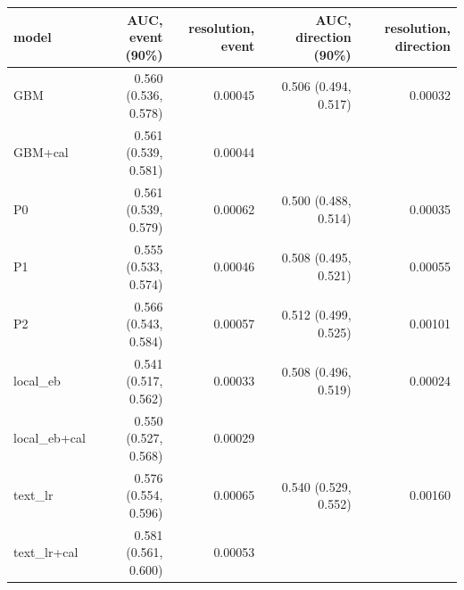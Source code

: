 \begin{tabular}{lrrrr}
\toprule
model & AUC, event (90\%) & resolution, event & AUC, direction (90\%) & resolution, direction \\
\midrule
GBM & 0.560 (0.536, 0.578) & 0.00045 & 0.506 (0.494, 0.517) & 0.00032 \\
GBM+cal & 0.561 (0.539, 0.581) & 0.00044 &  &  \\
P0 & 0.561 (0.539, 0.579) & 0.00062 & 0.500 (0.488, 0.514) & 0.00035 \\
P1 & 0.555 (0.533, 0.574) & 0.00046 & 0.508 (0.495, 0.521) & 0.00055 \\
P2 & 0.566 (0.543, 0.584) & 0.00057 & 0.512 (0.499, 0.525) & 0.00101 \\
local\_eb & 0.541 (0.517, 0.562) & 0.00033 & 0.508 (0.496, 0.519) & 0.00024 \\
local\_eb+cal & 0.550 (0.527, 0.568) & 0.00029 &  &  \\
text\_lr & 0.576 (0.554, 0.596) & 0.00065 & 0.540 (0.529, 0.552) & 0.00160 \\
text\_lr+cal & 0.581 (0.561, 0.600) & 0.00053 &  &  \\
\bottomrule
\end{tabular}
